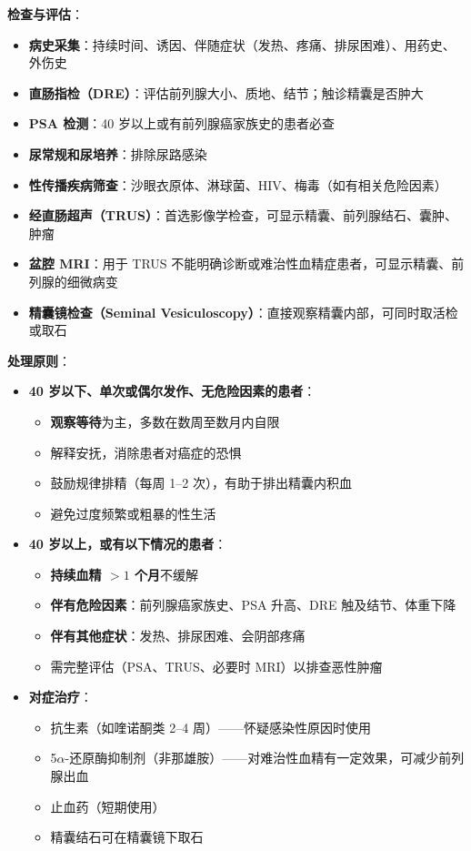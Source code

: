 \vspace{0.5em}
\noindent\textbf{检查与评估}：

\begin{itemize}[leftmargin=2cm]
	\item \textbf{病史采集}：持续时间、诱因、伴随症状（发热、疼痛、排尿困难）、用药史、外伤史
	\item \textbf{直肠指检（DRE）}：评估前列腺大小、质地、结节；触诊精囊是否肿大
	\item \textbf{PSA 检测}：40 岁以上或有前列腺癌家族史的患者必查
	\item \textbf{尿常规和尿培养}：排除尿路感染
	\item \textbf{性传播疾病筛查}：沙眼衣原体、淋球菌、HIV、梅毒（如有相关危险因素）
	\item \textbf{经直肠超声（TRUS）}：首选影像学检查，可显示精囊、前列腺结石、囊肿、肿瘤
	\item \textbf{盆腔 MRI}：用于 TRUS 不能明确诊断或难治性血精症患者，可显示精囊、前列腺的细微病变
	\item \textbf{精囊镜检查（Seminal Vesiculoscopy）}：直接观察精囊内部，可同时取活检或取石
\end{itemize}

\vspace{0.5em}
\noindent\textbf{处理原则}：

\begin{itemize}[leftmargin=2cm]
	\item \textbf{40 岁以下、单次或偶尔发作、无危险因素的患者}：
	\begin{itemize}
		\item \textbf{观察等待}为主，多数在数周至数月内自限
		\item 解释安抚，消除患者对癌症的恐惧
		\item 鼓励规律排精（每周 1--2 次），有助于排出精囊内积血
		\item 避免过度频繁或粗暴的性生活
	\end{itemize}

	\item \textbf{40 岁以上，或有以下情况的患者}：
	\begin{itemize}
		\item \textbf{持续血精 $>1$ 个月}不缓解
		\item \textbf{伴有危险因素}：前列腺癌家族史、PSA 升高、DRE 触及结节、体重下降
		\item \textbf{伴有其他症状}：发热、排尿困难、会阴部疼痛
		\item 需完整评估（PSA、TRUS、必要时 MRI）以排查恶性肿瘤
	\end{itemize}

	\item \textbf{对症治疗}：
	\begin{itemize}
		\item 抗生素（如喹诺酮类 2--4 周）——怀疑感染性原因时使用
		\item 5$\alpha$-还原酶抑制剂（非那雄胺）——对难治性血精有一定效果，可减少前列腺出血
		\item 止血药（短期使用）
		\item 精囊结石可在精囊镜下取石
	\end{itemize}
\end{itemize}

